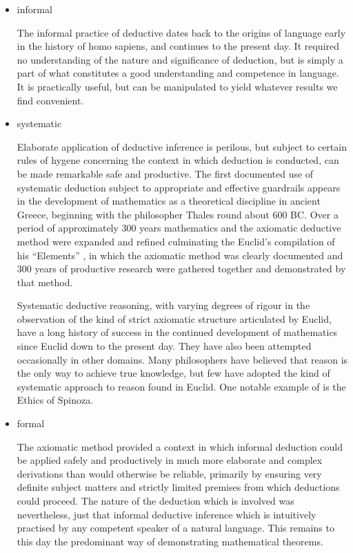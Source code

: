\documentclass[10pt,titlepage]{book}
\begin{document}
\begin{itemize}
\item informal
  
  The informal practice of deductive dates back to the origins of language early in the history of homo sapiens, and continues to the present day.
  It required no understanding of the nature and significance of deduction, but is simply a part of what constitutes a good understanding and competence in language.
  It is practically useful, but can be manipulated to yield whatever results we find convenient.
  
\item systematic

  Elaborate application of deductive inference is perilous, but subject to certain rules of hygene concerning the context in which deduction is conducted, can be made remarkable safe and productive.
  The first documented use of systematic deduction subject to appropriate and effective guardrails appears in the development of mathematics as a theoretical discipline in ancient Greece, beginning with the philosopher Thales round about 600 BC.
  Over a period of approximately 300 years mathematics and the axiomatic deductive method were expanded and refined culminating the Euclid's compilation of his ``Elements'' \cite{euclidEL1}, in which the axiomatic method was clearly documented and 300 years of productive research were gathered together and demonstrated by that method.

  Systematic deductive reasoning, with varying degrees of rigour in the observation of the kind of strict axiomatic structure articulated by Euclid, have a long history of success in the continued development of mathematics since Euclid down to the present day.
  They have also been attempted occasionally in other domains.
  Many philosophers have believed that reason is the only way to achieve true knowledge, but few have adopted the kind of systematic approach to reason found in Euclid.
  One notable example of is the Ethics of Spinoza.
  
\item formal 

  The axiomatic method provided a context in which informal deduction could be applied safely and productively in much more elaborate and complex derivations than would otherwise be reliable, primarily by ensuring very definite subject matters and strictly limited premises from which deductions could proceed.
  The nature of the deduction which is involved was nevertheless, just that informal deductive inference which is intuitively practised by any competent speaker of a natural language.
  This remains to this day the predominant way of demonstrating mathematical theorems.


\end{itemize}
\end{document}
